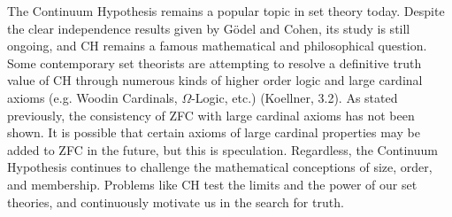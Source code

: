 \documentclass[10pt,letterpaper]{amsart}
\numberwithin{equation}{section}
\theoremstyle{plain}
\theoremstyle{definition}
\numberwithin{equation}{section}
\begin{document}
The Continuum Hypothesis remains a popular topic in set theory today. Despite the clear independence results given by Gödel and Cohen, its study is still ongoing, and CH remains a famous mathematical and philosophical question. Some contemporary set theorists are attempting to resolve a definitive truth value of CH through numerous kinds of higher order logic and large cardinal axioms (e.g. Woodin Cardinals, $\Omega$-Logic, etc.) (Koellner, 3.2). As stated previously, the consistency of ZFC with large cardinal axioms has not been shown. It is possible that certain axioms of large cardinal properties may be added to ZFC in the future, but this is speculation. Regardless, the Continuum Hypothesis continues to challenge the mathematical conceptions of size, order, and membership. Problems like CH test the limits and the power of our set theories, and continuously motivate us in the search for truth.\\
\end{document}
